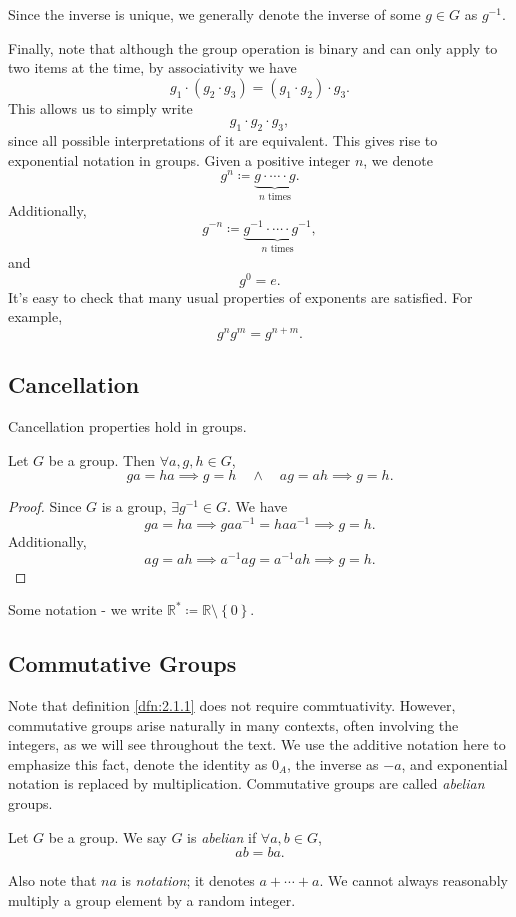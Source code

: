 Since the inverse is unique, we generally denote the inverse of some $g\in G$ as $g^{-1}$.

Finally, note that although the group operation is binary and can only apply to two items at the time, by associativity we have
\[
	g_1\cdot (g_2\cdot g_3)=(g_1\cdot g_2)\cdot g_3
.\]
This allows us to simply write
\[
	g_1\cdot g_2\cdot g_3
,\]
since all possible interpretations of it are equivalent. This gives rise to exponential notation in groups. Given a positive integer $n$, we denote
\[
	g^n\coloneqq \underset{n \text{ times}}{\underbrace{g\cdot \cdots \cdot g}}
.\]
Additionally,
\[
	g^{-n}\coloneqq \underset{n \text{ times}}{\underbrace{g^{-1}\cdot \cdots \cdot g^{-1}}}
,\]
and
\[
	g^0=e
.\]
It's easy to check that many usual properties of exponents are satisfied. For example,
\[
	g^ng^m=g^{n+m}
.\]
\subsection{Cancellation}
Cancellation properties hold in groups.
\begin{proposition}\label{prp:2.1.3}
	Let $G$ be a group. Then $\forall a,g,h\in G$,
	\[
		ga=ha\implies g=h\quad \land \quad ag=ah\implies g=h
	.\]
\end{proposition}
\begin{proof}
	Since $G$ is a group, $\exists g^{-1}\in G$. We have
	\[
		ga=ha\implies gaa^{-1}=haa^{-1}\implies g=h
	.\]
	Additionally,
	\[
		ag=ah\implies a^{-1}ag=a^{-1}ah\implies g=h
	.\]
\end{proof}
Some notation - we write $\mathbb{R}^* \coloneqq \mathbb{R}\setminus\left\{ 0 \right\} $.
\subsection{Commutative Groups}
Note that definition \ref{dfn:2.1.1} does not require commtuativity. However, commutative groups arise naturally in many contexts, often involving the integers, as we will see throughout the text. We use the additive notation here to emphasize this fact, denote the identity as $0_A$, the inverse as $-a$, and exponential notation is replaced by multiplication. Commutative groups are called \emph{abelian} groups.
\begin{definition}\label{dfn:2.1.2}
	Let $G$ be a group. We say $G$ is \emph{abelian} if $\forall a,b\in G$,
	\[
		ab=ba
	.\]
\end{definition}

Also note that $na$ is \emph{notation}; it denotes $a+\cdots+a$. We cannot always reasonably multiply a group element by a random integer.
